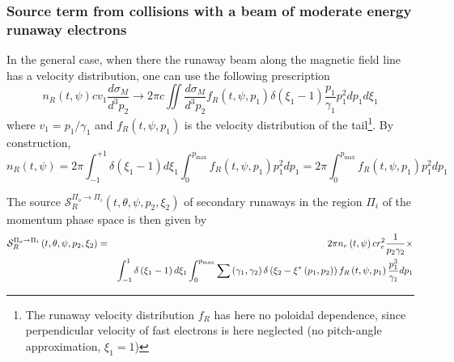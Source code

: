 \subsubsection{Source term from collisions with a beam of moderate energy
runaway electrons}

In the general case, when there the runaway beam along the magnetic field
line has a velocity distribution, one can use the following prescription 
\begin{equation}
n_{R}\left( t,\psi \right) cv_{1}\frac{d\sigma _{M}}{d^{3}p_{2}}\rightarrow
2\pi c\iint \frac{d\sigma _{M}}{d^{3}p_{2}}f_{R}\left( t,\psi ,p_{1}\right)
\delta \left( \xi _{1}-1\right) \frac{p_{1}}{\gamma _{1}}p_{1}^{2}dp_{1}d\xi
_{1}
\end{equation}%
where $v_{1}=p_{1}/\gamma _{1}$ and $f_{R}\left( t,\psi ,p_{1}\right) $ is
the velocity distribution of the tail\footnote{%
The runaway velocity distribution $f_{R}$ has here no poloidal dependence,
since perpendicular velocity of fast electrons is here neglected (no
pitch-angle approximation, $\xi _{1}=1$)}. By construction, 
\begin{equation}
n_{R}\left( t,\psi \right) =2\pi \int_{-1}^{+1}\delta \left( \xi
_{1}-1\right) d\xi _{1}\int_{0}^{p_{\max }}f_{R}\left( t,\psi ,p_{1}\right)
p_{1}^{2}dp_{1}=2\pi \int_{0}^{p_{\max }}f_{R}\left( t,\psi ,p_{1}\right)
p_{1}^{2}dp_{1}
\end{equation}

The source $\mathcal{S}_{R}^{\Pi _{o}\rightarrow \Pi _{i}}\left( t,\theta
,\psi ,p_{2},\xi _{2}\right) $ of secondary runaways in the region $\Pi _{i}$
of the momentum phase space is then given by 
\begin{eqnarray}
\mathcal{S}_{R}^{\Pi _{o}\rightarrow \Pi _{i}}\left( t,\theta ,\psi
,p_{2},\xi _{2}\right) &=&2\pi n_{e}\left( t,\psi \right) cr_{e}^{2}\frac{1}{%
p_{2}\gamma _{2}}\times  \notag \\
&&\int_{-1}^{1}\delta \left( \xi _{1}-1\right) d\xi _{1}\int_{0}^{p_{\max
}}\sum \left( \gamma _{1},\gamma _{2}\right) \delta \left( \xi _{2}-\xi
^{\ast }\left( p_{1},p_{2}\right) \right) f_{R}\left( t,\psi ,p_{1}\right) 
\frac{p_{1}^{3}}{\gamma _{1}}dp_{1}  \label{moderatesource}
\end{eqnarray}


